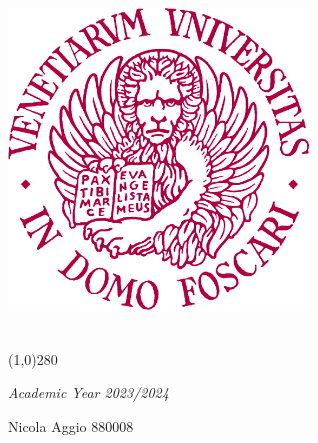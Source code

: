 \begin{titlepage}
	\begin{center}
		\includegraphics[width=0.6\textwidth]{unive}
		
		\vspace*{1cm}
		\LARGE
		
		\vspace{0.5cm}
		\Huge
		\textbf{\titolo}\\
		
		\line(1,0){280}
		
		\vspace{0.5cm}
		\large
		\textit{Academic Year 2023/2024}
		
		\vfill
		
	\end{center}
	\begin{raggedleft}
		\Large
		\large
		Nicola Aggio 880008\\
	\end{raggedleft}
\end{titlepage}


\renewcommand{\headheight}{14pt}

\pagestyle{fancy}
\lhead{}
\chead{}
\lhead{}
\rhead{\textbf{\titolo}}
\cfoot{}
\renewcommand{\headrulewidth}{0.4pt}
\renewcommand{\footrulewidth}{0.4pt}

\renewcommand{\labelitemii}{$\bullet$}
\renewcommand{\labelitemiii}{$\circ$}


